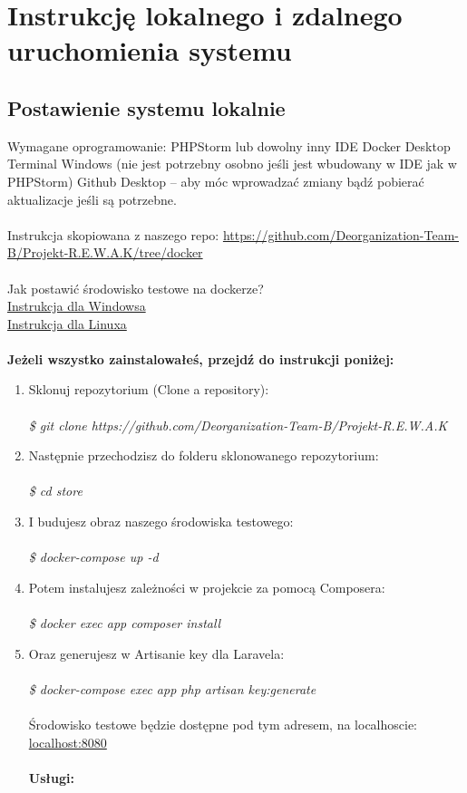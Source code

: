 \documentclass{article}
\begin{document}
\section{Instrukcję lokalnego i zdalnego uruchomienia systemu}
\subsection{Postawienie systemu lokalnie}
Wymagane oprogramowanie:
PHPStorm lub dowolny inny IDE
Docker Desktop
Terminal Windows (nie jest potrzebny osobno jeśli jest wbudowany w IDE jak w PHPStorm)
Github Desktop – aby móc wprowadzać zmiany bądź pobierać aktualizacje jeśli są potrzebne. \\\\
Instrukcja skopiowana z naszego repo: 
\url{https://github.com/Deorganization-Team-B/Projekt-R.E.W.A.K/tree/docker}\\\\
Jak postawić środowisko testowe na dockerze?\\
\href{https://docs.docker.com/docker-for-windows/}{Instrukcja dla Windowsa}\\
\href{https://docs.docker.com/compose/install/}{Instrukcja dla Linuxa}\\\\
\textbf{Jeżeli wszystko zainstalowałeś, przejdź do instrukcji poniżej:}
\begin{enumerate}
    \item Sklonuj repozytorium (Clone a repository):\\\\
    \emph{\$ git clone https://github.com/Deorganization-Team-B/Projekt-R.E.W.A.K}
    \item Następnie przechodzisz do folderu sklonowanego repozytorium:\\\\
    \emph{\$ cd store}
    \item I budujesz obraz naszego środowiska testowego:\\\\
    \emph{\$ docker-compose up -d}
    \item Potem instalujesz zależności w projekcie za pomocą Composera:\\\\
    \emph{\$ docker exec app composer install}
    \item Oraz generujesz w Artisanie key dla Laravela:\\\\
    \emph{\$ docker-compose exec app php artisan key:generate}\\\\
    Środowisko testowe będzie dostępne pod tym adresem, na localhoscie: \url{localhost:8080}\\\\
    \textbf{Usługi:}
    \end{enumerate}
\end{document}

